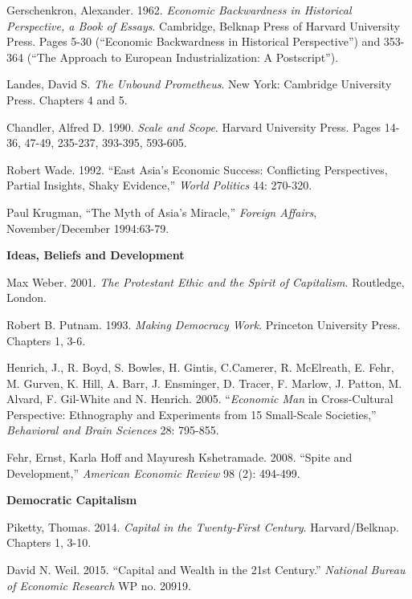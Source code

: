 \documentclass[letterpaper]{article}
\renewenvironment{itemize}{
  \begin{list}{}{
    \setlength{\leftmargin}{1.5em}
  }
}{
  \end{list}
}
\begin{document}
\begin{enumerate}
	\begin{itemize}
		\item[$\bullet$] Gerschenkron, Alexander. 1962. \emph{Economic Backwardness in Historical Perspective, a Book of Essays}. Cambridge, Belknap Press of Harvard University Press. Pages 5-30 (``Economic Backwardness in Historical Perspective'') and 353-364 (``The Approach to European Industrialization: A Postscript'').
		\item[$\bullet$] Landes, David S. \emph{The Unbound Prometheus}. New York: Cambridge University Press. Chapters 4 and 5. 
		\item[$\bullet$] Chandler, Alfred D. 1990. \emph{Scale and Scope}. Harvard University Press. Pages 14-36, 47-49, 235-237, 393-395, 593-605.
		\item[$\bullet$] Robert Wade. 1992. ``East Asia's Economic Success: Conflicting Perspectives, Partial Insights, Shaky
		Evidence,'' \emph{World Politics} 44: 270-320.
		\item[$\bullet$] Paul Krugman, ``The Myth of Asia's Miracle,'' \emph{Foreign Affairs}, November/December 1994:63-79.
	\end{itemize}



\item {\bf Ideas, Beliefs and Development}
	\begin{itemize}
		\item[$\bullet$] Max Weber. 2001. \emph{The Protestant Ethic and the Spirit of Capitalism}. Routledge, London. 
		\item[$\bullet$] Robert B. Putnam. 1993. \emph{Making Democracy Work}. Princeton University Press. Chapters 1, 3-6.
		\item[$\bullet$]  Henrich, J., R. Boyd, S. Bowles, H. Gintis, C.Camerer, R. McElreath, E. Fehr, M. Gurven, K. Hill, A. Barr, J. Ensminger, D. Tracer, F. Marlow, J. Patton, M. Alvard, F. Gil-White and N. Henrich. 2005. ``\emph{Economic Man} in Cross-Cultural Perspective: Ethnography and Experiments from 15 Small-Scale Societies,'' \emph{Behavioral and Brain Sciences} 28: 795-855.
		\item[$\bullet$]  Fehr, Ernst, Karla Hoff and Mayuresh Kshetramade. 2008. ``Spite and Development,'' \emph{American Economic Review} 98 (2): 494-499.
	\end{itemize}


\item {\bf Democratic Capitalism}

	\begin{itemize}
		\item[$\bullet$] Piketty, Thomas. 2014. \emph{Capital in the Twenty-First Century}. Harvard/Belknap. Chapters 1, 3-10.
		\item[$\bullet$] David N. Weil. 2015. ``Capital and Wealth in the 21st Century.'' \emph{National Bureau of Economic Research} WP no. 20919.
	\end{itemize}



\end{enumerate}
\end{document}
